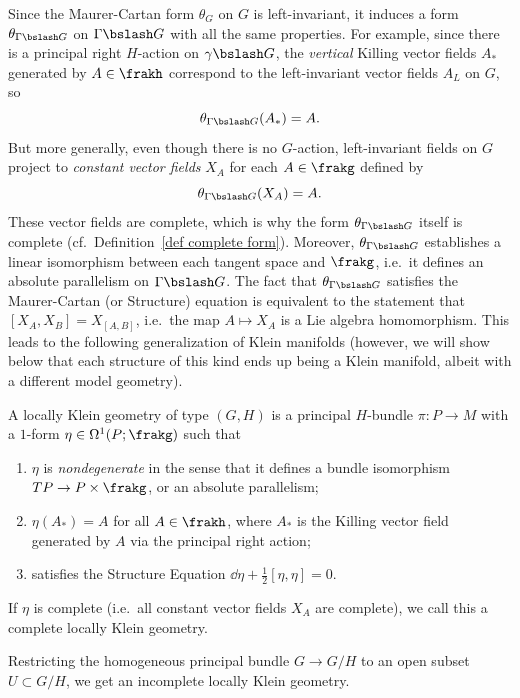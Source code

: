 Since the Maurer-Cartan form $\theta_G$ on $G$ is left-invariant, it induces a form $\theta_{\Gamma\bslash G}$ on $\Gamma\bslash G$ with all the same properties. For example, since there is a principal right $H$-action on $\gamma\bslash G$, the \emph{vertical} Killing vector fields $A_\ast$ generated by $A\in\frakh$ correspond to the left-invariant vector fields $A_L$ on $G$, so 
\[\theta_{\Gamma\bslash G}(A_\ast)=A.\]
But more generally, even though there is no $G$-action, left-invariant fields on $G$ project to \emph{constant vector fields} $X_A$ for each $A\in \frakg$ defined by 
\[\theta_{\Gamma\bslash G}(X_A)=A.\]
These vector fields are complete, which is why the form $\theta_{\Gamma\bslash G}$ itself is complete (cf.\ Definition~\ref{def complete form}). Moreover, $\theta_{\Gamma\bslash G}$ establishes a linear isomorphism between each tangent space and $\frakg$, i.e.\ it defines an absolute parallelism on $\Gamma\bslash G$.  The fact that $\theta_{\Gamma\bslash G}$ satisfies the Maurer-Cartan (or Structure) equation is equivalent to the statement that $[X_A,X_B]=X_{[A,B]}$, i.e.\ the map $A\mapsto X_A$ is a Lie algebra homomorphism. This leads to the following generalization of Klein manifolds (however, we will show below that each structure of this kind ends up being a Klein manifold, albeit with a different model geometry).


\begin{defn}
    A locally Klein geometry of type $(G,H)$ is a principal $H$-bundle $\pi:P\to M$ with a $1$-form $\eta\in \Omega^1(P;\frakg)$ such that 
    \begin{enumerate}
        \item $\eta$ is \emph{nondegenerate} in the sense that it defines a bundle isomorphism $TP\to P\times \frakg$, or an absolute parallelism;
        \item $\eta(A_\ast)=A$ for all $A\in\frakh$, where $A_\ast$ is the Killing vector field generated by $A$ via the principal right action;
        \item satisfies the Structure Equation $\dd\eta+\frac12[\eta,\eta]=0$.
    \end{enumerate}
    If $\eta$ is complete (i.e.\ all constant vector fields $X_A$ are complete), we call this a complete locally Klein geometry.
\end{defn}

\begin{example}
    Restricting the homogeneous principal bundle $G\to G\slash H$ to an open subset $U\subset G\slash H$, we get an incomplete locally Klein geometry.
\end{example}


